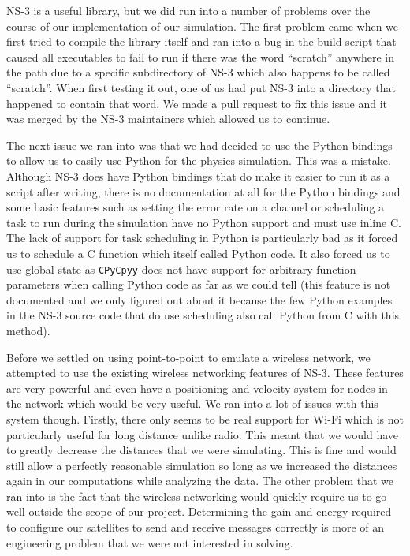 \documentclass[a4paper,12pt]{article}
\newcommand{\CC}{C\nolinebreak\hspace{-.05em}\raisebox{.4ex}{\tiny\bf +}\nolinebreak\hspace{-.10em}\raisebox{.4ex}{\tiny\bf +}}
\def\CC{{C\nolinebreak[4]\hspace{-.05em}\raisebox{.4ex}{\tiny\bf ++}}}
\begin{document}
NS-3 is a useful library, but we did run into a number of problems over the
course of our implementation of our simulation. The first problem came when we
first tried to compile the library itself and ran into a bug in the build script
that caused all executables to fail to run if there was the word ``scratch''
anywhere in the path due to a specific subdirectory of NS-3 which also happens
to be called ``scratch''. When first testing it out, one of us had put NS-3 into
a directory that happened to contain that word. We made a pull request to fix
this issue and it was merged by the NS-3 maintainers which allowed us to
continue.

The next issue we ran into was that we had decided to use the Python bindings to
allow us to easily use Python for the physics simulation. This was a mistake.
Although NS-3 does have Python bindings that do make it easier to run it as a
script after writing, there is no documentation at all for the Python bindings
and some basic features such as setting the error rate on a channel or
scheduling a task to run during the simulation have no Python support and must
use inline \CC. The lack of support for task scheduling in Python is
particularly bad as it forced us to schedule a \CC{} function which itself
called Python code. It also forced us to use global state as \texttt{CPyCpyy}
does not have support for arbitrary function parameters when calling Python code
as far as we could tell (this feature is not documented and we only figured out
about it because the few Python examples in the NS-3 source code that do use
scheduling also call Python from \CC{} with this method).

Before we settled on using point-to-point to emulate a wireless network, we
attempted to use the existing wireless networking features of NS-3. These
features are very powerful and even have a positioning and velocity system for
nodes in the network which would be very useful. We ran into a lot of issues
with this system though. Firstly, there only seems to be real support for Wi-Fi
which is not particularly useful for long distance unlike radio. This meant that
we would have to greatly decrease the distances that we were simulating. This is
fine and would still allow a perfectly reasonable simulation so long as we
increased the distances again in our computations while analyzing the data. The
other problem that we ran into is the fact that the wireless networking would
quickly require us to go well outside the scope of our project. Determining the
gain and energy required to configure our satellites to send and receive
messages correctly is more of an engineering problem that we were not interested
in solving.
\end{document}
